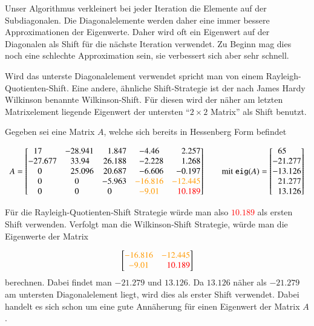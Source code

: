 Unser Algorithmus verkleinert bei jeder Iteration die Elemente auf der Subdiagonalen.
Die Diagonalelemente werden daher eine immer bessere Approximationen der Eigenwerte.
Daher wird oft ein Eigenwert auf der Diagonalen als Shift für die nächste Iteration verwendet.
Zu Beginn mag dies noch eine schlechte Approximation sein, sie verbessert sich aber sehr schnell.

Wird das unterste Diagonalelement verwendet spricht man von einem Rayleigh-Quotienten-Shift.
%
%
Eine andere, ähnliche Shift-Strategie ist der nach James Hardy Wilkinson benannte Wilkinson-Shift.
%
%
%
%
Für diesen wird der näher am letzten Matrixelement liegende Eigenwert der untersten "`$2\times2$ Matrix"' als Shift benutzt.


\begin{beispiel}
	Gegeben sei eine Matrix $A$, welche sich bereits in Hessenberg Form befindet
	
	\begin{equation}
	A=
	\begin{bmatrix*}[r]
	17\phantom{.000} & -28.941 & 1.847 & -4.46\phantom{0} & 2.257\\
	-27.677 & 33.94\phantom{0} & 26.188 & -2.228 & 1.268\\
	0\phantom{.000} & 25.096 & 20.687 & -6.606 & -0.197\\
	0\phantom{.000} & 0\phantom{.000} & -5.963 & \textcolor{orange}{-16.816} & \textcolor{orange}{-12.445}\\
	0\phantom{.000} & 0\phantom{.000} & 0\phantom{.000} & \textcolor{orange}{-9.01}\phantom{0} & \textcolor{red}{10.189}
	\end{bmatrix*} 
	\qquad
	\text{mit }
	\texttt{eig}(A)=
	\begin{bmatrix*}[r]
	65\phantom{.000}\\
	-21.277 \\
	-13.126 \\
	21.277 \\
	13.126 
	\end{bmatrix*}
	\end{equation}
	
	Für die Rayleigh-Quotienten-Shift Strategie würde man also \textcolor{red}{$10.189$} als ersten Shift verwenden.
	Verfolgt man die Wilkinson-Shift Strategie, würde man die Eigenwerte der Matrix

	\begin{equation}
	\begin{bmatrix*}[r]
	 \textcolor{orange}{-16.816} & \textcolor{orange}{-12.445}\\
	 \textcolor{orange}{-9.01\phantom{0}} & \textcolor{red}{10.189}
	\end{bmatrix*}
	\end{equation}
	berechnen.
	Dabei findet man $-21.279$ und $13.126$.
	Da $13.126$ näher als $-21.279$ am untersten Diagonalelement liegt, wird dies als erster Shift verwendet.
	Dabei handelt es sich schon um eine gute Annäherung für einen Eigenwert der Matrix $A$.	
\end{beispiel}



